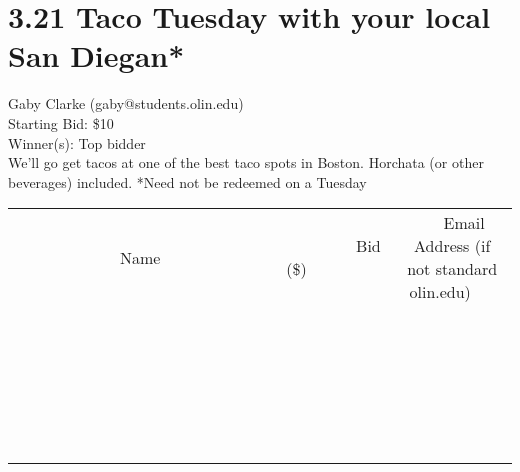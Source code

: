 \documentclass[11pt]{article}
\begin{document}
\section*{3.21 Taco Tuesday with your local San Diegan*}
Gaby Clarke (gaby@students.olin.edu) \\
Starting Bid: \$10 \\
Winner(s): 
Top bidder \\
We'll go get tacos at one of the best taco spots in Boston. Horchata (or other beverages) included. *Need not be redeemed on a Tuesday \\[6ex]
\begin{tabular}{c c c}
~~~~~~~~~~~~~Name~~~~~~~~~~~~~ & ~~~~~~~~~Bid (\$)~~~~~~~~~ & ~~~Email Address (if not standard olin.edu)~~~ \\
 & & \\
\hline
 & & \\
\hline
 & & \\
\hline
 & & \\
\hline
 & & \\
\hline
 & & \\
\hline
 & & \\
\hline
 & & \\
\hline
 & & \\
\hline
 & & \\
\hline
 & & \\
\hline
 & & \\
\hline
 & & \\
\hline
 & & \\
\hline
 & & \\
\hline
 & & \\
\hline
 & & \\
\hline
 & & \\
\hline
 & & \\
\hline
 & & \\
\hline
 & & \\
\hline
 & & \\
\hline
 & & \\
\hline
 & & \\
\hline
 & & \\
\hline
 & & \\
\hline
\end{tabular}
\clearpage
\end{document}
